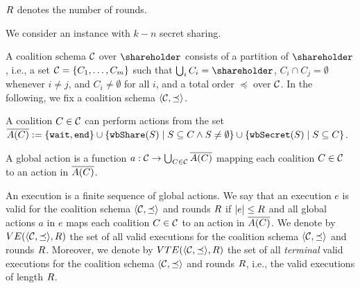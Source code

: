 %
$R$ denotes the number of rounds.

%
We consider an \shortname instance with $k-n$ secret sharing.

%
A coalition schema $\mathcal{C}$ over $\shareholder$ consists of a partition of $\shareholder$, i.e., a set $\mathcal{C} = \{ C_1, \ldots, C_m\}$ such that $\bigcup_{i}C_i = \shareholder$, $C_i \cap C_j = \emptyset$ whenever $i \neq j$, and $C_i \neq \emptyset$ for all $i$, and a total order $\preceq$ over $\mathcal{C}$.
%
In the following, we fix a coalition schema $\langle \mathcal{C},\preceq \rangle$.


%
A coalition $C \in \mathcal{C}$ can perform actions from the set $\overline{A(C)} := \{\mathtt{wait}, \mathtt{end} \} \cup \{ \mathtt{wbShare}(S) \mid S \subseteq C \wedge S \neq \emptyset\} \cup \{ \mathtt{wbSecret}(S) \mid S \subseteq C\}$.

%
A global action is a function $a: \mathcal{C} \to \bigcup_{C \in \mathcal{C}} \overline{A(C)}$ mapping each coalition $C \in \mathcal{C}$ to an action in $\overline{A(C)}$.

%
An execution is a finite sequence of global actions.
%
%
%
We say that an execution $e$ is valid for the coalition schema $\langle \mathcal{C},\preceq \rangle$ and rounds $R$ if $|e| \leq R$ and all global actions $a$ in $e$ maps each coalition $C \in \mathcal{C}$ to an action in $\overline{A(C)}$.
%
We denote by $VE(\langle \mathcal{C},\preceq \rangle,R)$ the set of all valid executions for the coalition schema $\langle \mathcal{C},\preceq \rangle$ and rounds $R$.
%
Moreover, we denote by $VTE(\langle \mathcal{C},\preceq \rangle,R)$ the set of all \textit{terminal} valid executions for the coalition schema $\langle \mathcal{C},\preceq \rangle$ and rounds $R$, i.e., the valid executions of length $R$.


